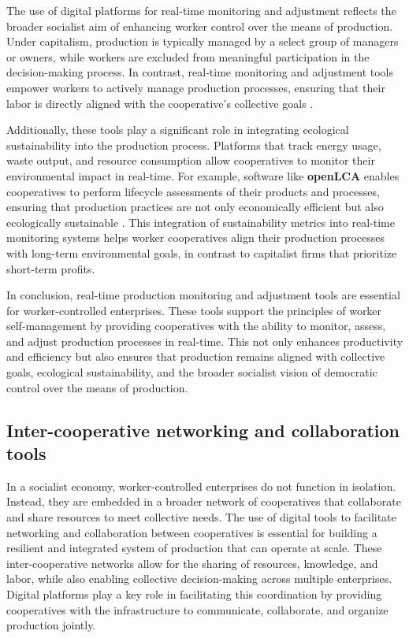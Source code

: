 \begin{refsection}
The use of digital platforms for real-time monitoring and adjustment reflects the broader socialist aim of enhancing worker control over the means of production. Under capitalism, production is typically managed by a select group of managers or owners, while workers are excluded from meaningful participation in the decision-making process. In contrast, real-time monitoring and adjustment tools empower workers to actively manage production processes, ensuring that their labor is directly aligned with the cooperative’s collective goals \cite[pp.~86-88]{braverman1974}.

Additionally, these tools play a significant role in integrating ecological sustainability into the production process. Platforms that track energy usage, waste output, and resource consumption allow cooperatives to monitor their environmental impact in real-time. For example, software like \textbf{openLCA} enables cooperatives to perform lifecycle assessments of their products and processes, ensuring that production practices are not only economically efficient but also ecologically sustainable \cite[pp.~214-217]{wright2010}. This integration of sustainability metrics into real-time monitoring systems helps worker cooperatives align their production processes with long-term environmental goals, in contrast to capitalist firms that prioritize short-term profits.

In conclusion, real-time production monitoring and adjustment tools are essential for worker-controlled enterprises. These tools support the principles of worker self-management by providing cooperatives with the ability to monitor, assess, and adjust production processes in real-time. This not only enhances productivity and efficiency but also ensures that production remains aligned with collective goals, ecological sustainability, and the broader socialist vision of democratic control over the means of production.

\subsection{Inter-cooperative networking and collaboration tools}

In a socialist economy, worker-controlled enterprises do not function in isolation. Instead, they are embedded in a broader network of cooperatives that collaborate and share resources to meet collective needs. The use of digital tools to facilitate networking and collaboration between cooperatives is essential for building a resilient and integrated system of production that can operate at scale. These inter-cooperative networks allow for the sharing of resources, knowledge, and labor, while also enabling collective decision-making across multiple enterprises. Digital platforms play a key role in facilitating this coordination by providing cooperatives with the infrastructure to communicate, collaborate, and organize production jointly.


\end{refsection}
